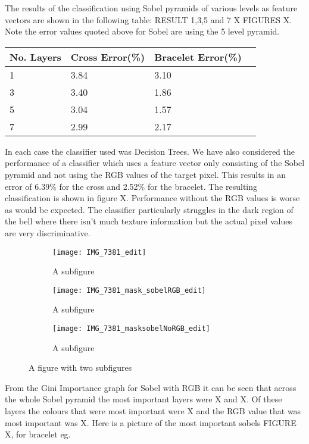 \documentclass[12pt]{IIBproject}
\begin{document}
The results of the classification using Sobel pyramids of various levels as feature vectors are shown in the following table: RESULT 1,3,5 and 7 X FIGURES X. Note the error values quoted above for Sobel are using the 5 level pyramid.
\begin{center}
    \begin{tabular}{ | l | l | l | p{5cm} |}
    \hline
    No. Layers & Cross Error(\%) & Bracelet Error(\%) \\ \hline
    1 & 3.84 & 3.10 \\ \hline
    3 & 3.40 & 1.86 \\ \hline
    5 & 3.04 & 1.57 \\
    \hline
    7 & 2.99 & 2.17 \\
    \hline
    
    \end{tabular}
    
\end{center}
In each case the classifier used was Decision Trees. We have also considered the performance of a classifier which uses a feature vector only consisting of the Sobel pyramid and not using the RGB values of the target pixel. This results in an error of 6.39\% for the cross and 2.52\% for the bracelet. The resulting classification is shown in figure X. Performance without the RGB values is worse as would be expected. The classifier particularly struggles in the dark region of the bell where there isn't much texture information but the actual pixel values are very discriminative.
\begin{figure}[H]
\centering
\begin{subfigure}{.5\textwidth}
  \centering
  \texttt{[image: IMG\_7381\_edit]}
  \caption{A subfigure}
  \label{fig:sub2}
\end{subfigure}
\begin{subfigure}{.5\textwidth}
  \centering
  \texttt{[image: IMG\_7381\_mask\_sobelRGB\_edit]}
  \caption{A subfigure}
  \label{fig:sub1}
\end{subfigure}%
\begin{subfigure}{.5\textwidth}
  \centering
  \texttt{[image: IMG\_7381\_masksobelNoRGB\_edit]}
  \caption{A subfigure}
  \label{fig:sub2}
\end{subfigure}

\caption{A figure with two subfigures}
\label{fig:test}
\end{figure}

From the Gini Importance graph for Sobel with RGB it can be seen that across the whole Sobel pyramid the most important layers were X and X. Of these layers the colours that were most important were X and the RGB value that was most important was X. Here is a picture of the most important sobels FIGURE X, for bracelet eg.
\end{document}
